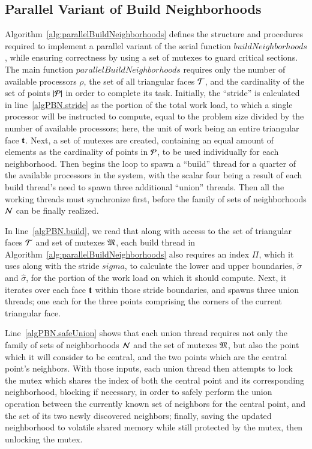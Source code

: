 %
%
\subsection{Parallel Variant of Build Neighborhoods}
\label{ch6sBNPssPVBN}
Algorithm~\ref{alg:parallelBuildNeighborhoods} defines the structure and procedures required to implement a parallel variant of the serial function $\mathit{buildNeighborhoods}$, while ensuring correctness by using a set of mutexes to guard critical sections. The main function $\mathit{parallelBuildNeighborhoods}$ requires only the number of available processors $\rho$, the set of all triangular faces $\mathcal{T}$, and the cardinality of the set of points $|\mathcal{P}|$ in order to complete its task. Initially, the ``stride'' is calculated in line~\ref{algPBN.stride} as the portion of the total work load, to which a single processor will be instructed to compute, equal to the problem size divided by the number of available processors; here, the unit of work being an entire triangular face $\mathbf{t}$. Next, a set of mutexes are created, containing an equal amount of elements as the cardinality of points in $\mathcal{P}$, to be used individually for each neighborhood.  Then begins the loop to spawn a ``build'' thread for a quarter of the available processors in the system, with the scalar four being a result of each build thread's need to spawn three additional ``union'' threads. Then all the working threads must synchronize first, before the family of sets of neighborhoods $\mathcal{N}$ can be finally realized.

In line~\ref{algPBN.build}, we read that along with access to the set of triangular faces $\mathcal{T}$ and set of mutexes $\mathfrak{M}$, each build thread in Algorithm~\ref{alg:parallelBuildNeighborhoods} also requires an index $\Pi$, which it uses along with the stride $sigma$, to calculate the lower and upper boundaries, $\check{\sigma}$ and $\hat{\sigma}$, for the portion of the work load on which it should compute. Next, it iterates over each face $\mathbf{t}$ within those stride boundaries, and spawns three union threads; one each for the three points comprising the corners of the current triangular face.

Line~\ref{algPBN.safeUnion} shows that each union thread requires not only the family of sets of neighborhoods $\mathcal{N}$ and the set of mutexes $\mathfrak{M}$, but also the point which it will consider to be central, and the two points which are the central point's neighbors. With those inputs, each union thread then attempts to lock the mutex which shares the index of both the central point and its corresponding neighborhood, blocking if necessary, in order to safely perform the union operation between the currently known set of neighbors for the central point, and the set of its two newly discovered neighbors; finally, saving the updated neighborhood to volatile shared memory while still protected by the mutex, then unlocking the mutex.

